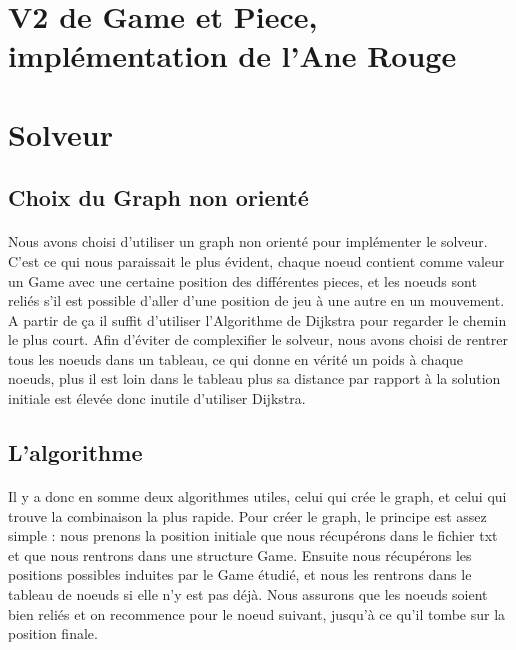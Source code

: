 \documentclass {article}
\begin{document}
\section{V2 de Game et Piece, implémentation de l'Ane Rouge}
\paragraph{}

\section{Solveur}
\subsection{Choix du Graph non orienté}
\paragraph{}
Nous avons choisi d'utiliser un graph non orienté pour implémenter le solveur. C'est ce qui nous paraissait le plus évident, chaque noeud contient comme valeur un Game avec une certaine position des différentes pieces, et les noeuds sont reliés s'il est possible d'aller d'une position de jeu à une autre en un mouvement. A partir de ça il suffit d'utiliser l'Algorithme de Dijkstra pour regarder le chemin le plus court. Afin d'éviter de complexifier le solveur, nous avons choisi de rentrer tous les noeuds dans un tableau, ce qui donne en vérité un poids à chaque noeuds, plus il est loin dans le tableau plus sa distance par rapport à la solution initiale est élevée donc inutile d'utiliser Dijkstra.

\subsection{L'algorithme}
\paragraph{}
Il y a donc en somme deux algorithmes utiles, celui qui crée le graph, et celui qui trouve la combinaison la plus rapide. Pour créer le graph, le principe est assez simple : nous prenons la position initiale que nous récupérons dans le fichier txt et que nous rentrons dans une structure Game. Ensuite nous récupérons les positions possibles induites par le Game étudié, et nous les rentrons dans le tableau de noeuds si elle n'y est pas déjà. Nous assurons que les noeuds soient bien reliés et on recommence pour le noeud suivant, jusqu'à ce qu'il tombe sur la position finale.
\end{document}
